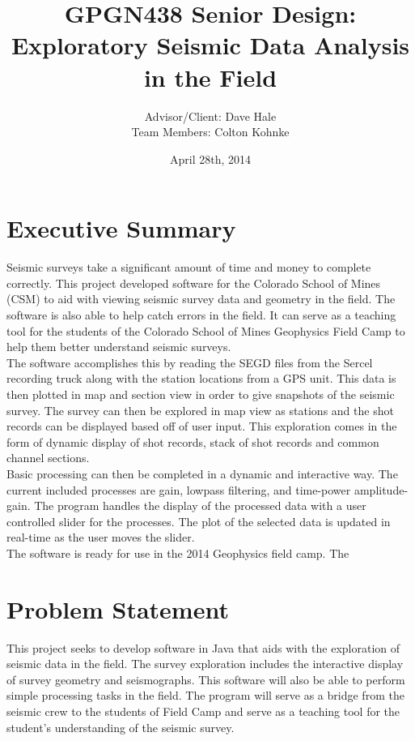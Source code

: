 \documentclass[12pt]{article}
\author{Advisor/Client: Dave Hale \\ Team Members: Colton Kohnke}
\title{GPGN438 Senior Design: \\ Exploratory Seismic Data Analysis in the Field}
\date{April 28th, 2014}
\begin{document}
\maketitle
\newpage

\section{Executive Summary}

Seismic surveys take a significant amount of time and money to complete correctly. This project developed software for the Colorado School of Mines (CSM) to aid with viewing seismic survey data and geometry in the field. The software is also able to help catch errors in the field. It can serve as a teaching tool for the students of the Colorado School of Mines Geophysics Field Camp to help them better understand seismic surveys. \\

The software accomplishes this by reading the SEGD files from the Sercel recording truck along with the station locations from a GPS unit. This data is then plotted in map and section view in order to give snapshots of the seismic survey. The survey can then be explored in map view as stations and the shot records can be displayed based off of user input. This exploration comes in the form of dynamic display of shot records, stack of shot records and common channel sections.\\

Basic processing can then be completed in a dynamic and interactive way. The current included processes are gain, lowpass filtering, and time-power amplitude-gain. The program handles the display of the processed data with a user controlled slider for the processes. The plot of the selected data is updated in real-time as the user moves the slider. \\

The software is ready for use in the 2014 Geophysics field camp. The

\newpage
\tableofcontents
\listoffigures
\listoftables
\newpage

\section{Problem Statement}

This project seeks to develop software in Java that aids with the exploration of seismic data in the field. The survey exploration includes the interactive display of survey geometry and seismographs. This software will also be able to perform simple processing tasks in the field. The program will serve as a bridge from the seismic crew to the students of Field Camp and serve as a teaching tool for the student's understanding of the seismic survey.
\end{document}
